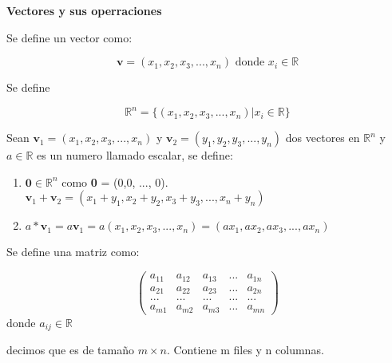 \begin{frame}

\textbf{Vectores y sus operraciones}

Se define un vector como:

$$
\textbf{v} = (x_1, x_2, x_3, ..., x_n) \text{ donde } x_i \in \mathbb{R}
$$

Se define

$$
\mathbb{R}^n = \{(x_1, x_2, x_3, ..., x_n) | x_i \in \mathbb{R} \}
$$ 

\end{frame}

\begin{frame}

Sean $\textbf{v}_1 = (x_1, x_2, x_3, ..., x_n)$ y $\textbf{v}_2 = (y_1, y_2, y_3, ..., y_n)$  
dos vectores en $\mathbb{R}^n$ y $a \in \mathbb{R}$ es un numero llamado escalar, se define:

\begin{enumerate}
\item $\textbf{0} \in \mathbb{R}^n$ como \textbf{0} = (0,0, ..., 0).
\iten $\textbf{v}_1 + \textbf{v}_2 = (x_1+y_1, x_2+y_2, x_3+y_3, ..., x_n+y_n)$
\item $a * \textbf{v}_1 = a \textbf{v}_1 = a(x_1, x_2, x_3, ..., x_n) = (ax_1, ax_2, ax_3, ..., ax_n)$
\end{enumerate}

\end{frame}

\begin{frame}

Se define una matriz como:

$$
\begin{pmatrix}
a_{11} & a_{12} & a_{13} & ...  & a_{1n} \\
a_{21} & a_{22} & a_{23} & ...  & a_{2n} \\
... & ... & ... & ... & ... \\
a_{m1} & a_{m2} & a_{m3} & ...  & a_{mn} 
\end{pmatrix}
$$ donde $a_{ij} \in \mathbb{R}$

decimos que es de tamaño $m \times n$. Contiene m files y n columnas.

\end{frame}

\begin{frame}


\end{frame}

\begin{frame}


\end{frame}







